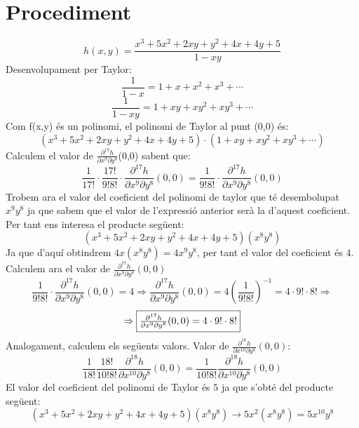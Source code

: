\documentclass[12pt]{report}
\begin{document}
\section{Procediment}
$$h(x, y) = \frac{x^{3}+5x^{2}+2xy+y^{2}+4x+4y+5}{1-xy}$$
Desenvolupament per Taylor:
$$\frac{1}{1-x} = 1 + x + x^{2} + x^{3} + \cdots$$
$$\frac{1}{1-xy} = 1 + xy + xy^{2} + xy^{3} +  \cdots$$
Com f(x,y) és un polinomi, el polinomi de Taylor al punt (0,0) és:
\begin{equation*}
    (x^{3}+5x^{2}+2xy+y^{2}+4x+4y+5)\cdot (1 + xy + xy^2 + xy^3 + \cdots )
\end{equation*}
Calculem el valor de $\frac{\partial ^{17} h }{\partial x^9 \partial y^8}$(0,0) sabent que: 
\begin{equation*}
    \frac{1}{17!}\cdot\frac{17!}{9!8!}\cdot\frac{\partial ^{17} h }{\partial x^9 \partial y^8}(0,0) = \frac{1}{9!8!}\cdot\frac{\partial ^{17} h }{\partial x^9 \partial y^8}(0,0)
\end{equation*}
\newline\newline
Trobem ara el valor del coeficient del polinomi de taylor que té desembolupat $x^9y^8$ ja que sabem que el valor de l'expressió anterior serà la d'aquest coeficient.
\newline
Per tant ens interesa el producte  següent:
$$(x^{3}+5x^{2}+2xy+y^{2}+4x+4y+5)(x^8y^8)$$
Ja que d'aquí obtindrem $4x(x^8y^8) = 4x^9y^8$, per tant el valor del coeficient és $4$.\\
Calculem ara el valor de $\frac{\partial ^{17} h }{\partial x^9 \partial y^8}(0,0)$
$$\frac{1}{9!8!}\cdot\frac{\partial ^{17} h }{\partial x^9 \partial y^8}(0,0) = 4  \Rightarrow \frac{\partial ^{17} h }{\partial x^9 \partial y^8}(0,0) = 4\left(\frac{1}{9!8!}\right)^{-1}=4\cdot9!\cdot8! \Rightarrow $$
\begin{equation}
    \Rightarrow\fcolorbox{black}{white}{$ \frac{\partial ^{17} h }{\partial x^9 \partial y^8}(0,0) = 4\cdot9!\cdot8!$}
    \label{probabilitat cristall}
\end{equation}
Analogament, calculem els següents valors.
\newline
Valor de $\frac{\partial ^{18} h }{\partial x^{10} \partial y^8}(0,0):$
 $$\frac{1}{18!}\frac{18!}{10!8!}\frac{\partial ^18 h }{\partial x^10 \partial y^8}(0,0) =  \frac{1}{10!8!}\frac{\partial ^{18} h }{\partial x^{10} \partial y^8}(0,0)$$
El valor del coeficient del polinomi de Taylor és $5$ ja que s'obté del producte següent:
$$(x^{3}+5x^{2}+2xy+y^{2}+4x+4y+5)(x^8y^8)\rightarrow 5x^2(x^8y^8) = 5x^{10}y^8$$
\end{document}
